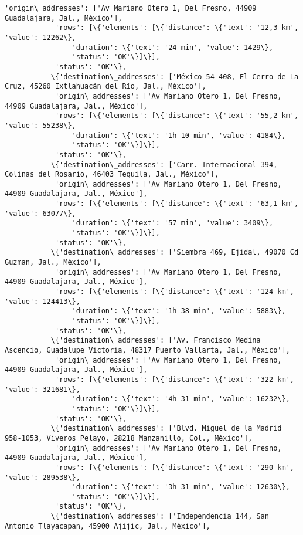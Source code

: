 \documentclass[11pt]{article}
\begin{document}
\begin{Verbatim}[commandchars=\\\{\}]
            'origin\_addresses': ['Av Mariano Otero 1, Del Fresno, 44909 Guadalajara, Jal., México'],
            'rows': [\{'elements': [\{'distance': \{'text': '12,3 km', 'value': 12262\},
                'duration': \{'text': '24 min', 'value': 1429\},
                'status': 'OK'\}]\}],
            'status': 'OK'\},
           \{'destination\_addresses': ['México 54 408, El Cerro de La Cruz, 45260 Ixtlahuacán del Río, Jal., México'],
            'origin\_addresses': ['Av Mariano Otero 1, Del Fresno, 44909 Guadalajara, Jal., México'],
            'rows': [\{'elements': [\{'distance': \{'text': '55,2 km', 'value': 55238\},
                'duration': \{'text': '1h 10 min', 'value': 4184\},
                'status': 'OK'\}]\}],
            'status': 'OK'\},
           \{'destination\_addresses': ['Carr. Internacional 394, Colinas del Rosario, 46403 Tequila, Jal., México'],
            'origin\_addresses': ['Av Mariano Otero 1, Del Fresno, 44909 Guadalajara, Jal., México'],
            'rows': [\{'elements': [\{'distance': \{'text': '63,1 km', 'value': 63077\},
                'duration': \{'text': '57 min', 'value': 3409\},
                'status': 'OK'\}]\}],
            'status': 'OK'\},
           \{'destination\_addresses': ['Siembra 469, Ejidal, 49070 Cd Guzman, Jal., México'],
            'origin\_addresses': ['Av Mariano Otero 1, Del Fresno, 44909 Guadalajara, Jal., México'],
            'rows': [\{'elements': [\{'distance': \{'text': '124 km', 'value': 124413\},
                'duration': \{'text': '1h 38 min', 'value': 5883\},
                'status': 'OK'\}]\}],
            'status': 'OK'\},
           \{'destination\_addresses': ['Av. Francisco Medina Ascencio, Guadalupe Victoria, 48317 Puerto Vallarta, Jal., México'],
            'origin\_addresses': ['Av Mariano Otero 1, Del Fresno, 44909 Guadalajara, Jal., México'],
            'rows': [\{'elements': [\{'distance': \{'text': '322 km', 'value': 321681\},
                'duration': \{'text': '4h 31 min', 'value': 16232\},
                'status': 'OK'\}]\}],
            'status': 'OK'\},
           \{'destination\_addresses': ['Blvd. Miguel de la Madrid 958-1053, Viveros Pelayo, 28218 Manzanillo, Col., México'],
            'origin\_addresses': ['Av Mariano Otero 1, Del Fresno, 44909 Guadalajara, Jal., México'],
            'rows': [\{'elements': [\{'distance': \{'text': '290 km', 'value': 289538\},
                'duration': \{'text': '3h 31 min', 'value': 12630\},
                'status': 'OK'\}]\}],
            'status': 'OK'\},
           \{'destination\_addresses': ['Independencia 144, San Antonio Tlayacapan, 45900 Ajijic, Jal., México'],

\end{Verbatim}
\end{document}
